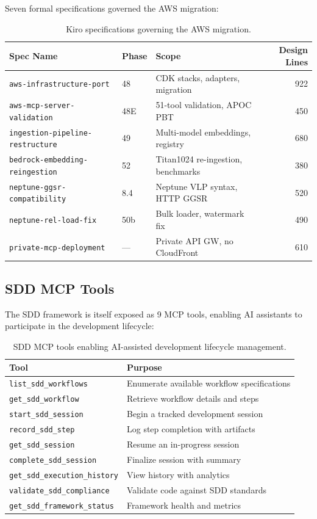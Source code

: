 \documentclass[11pt,letterpaper]{article}
\begin{document}
Seven formal specifications governed the AWS migration:

\begin{table}[H]
\centering
\footnotesize
\begin{tabular}{@{}lllr@{}}
\toprule
\textbf{Spec Name} & \textbf{Phase} & \textbf{Scope} & \textbf{Design Lines} \\
\midrule
\texttt{aws-infrastructure-port} & 48 & CDK stacks, adapters, migration & 922 \\
\texttt{aws-mcp-server-validation} & 48E & 51-tool validation, APOC PBT & 450 \\
\texttt{ingestion-pipeline-restructure} & 49 & Multi-model embeddings, registry & 680 \\
\texttt{bedrock-embedding-reingestion} & 52 & Titan1024 re-ingestion, benchmarks & 380 \\
\texttt{neptune-ggsr-compatibility} & 8.4 & Neptune VLP syntax, HTTP GGSR & 520 \\
\texttt{neptune-rel-load-fix} & 50b & Bulk loader, watermark fix & 490 \\
\texttt{private-mcp-deployment} & --- & Private API GW, no CloudFront & 610 \\
\bottomrule
\end{tabular}
\caption{Kiro specifications governing the AWS migration.}
\label{tab:kiro-specs}
\end{table}

\subsection{SDD MCP Tools}

The SDD framework is itself exposed as 9 MCP tools, enabling AI assistants
to participate in the development lifecycle:

\begin{table}[H]
\centering
\footnotesize
\begin{tabular}{@{}ll@{}}
\toprule
\textbf{Tool} & \textbf{Purpose} \\
\midrule
\texttt{list\_sdd\_workflows} & Enumerate available workflow specifications \\
\texttt{get\_sdd\_workflow} & Retrieve workflow details and steps \\
\texttt{start\_sdd\_session} & Begin a tracked development session \\
\texttt{record\_sdd\_step} & Log step completion with artifacts \\
\texttt{get\_sdd\_session} & Resume an in-progress session \\
\texttt{complete\_sdd\_session} & Finalize session with summary \\
\texttt{get\_sdd\_execution\_history} & View history with analytics \\
\texttt{validate\_sdd\_compliance} & Validate code against SDD standards \\
\texttt{get\_sdd\_framework\_status} & Framework health and metrics \\
\bottomrule
\end{tabular}
\caption{SDD MCP tools enabling AI-assisted development lifecycle management.}
\label{tab:sdd-tools}
\end{table}
\end{document}
